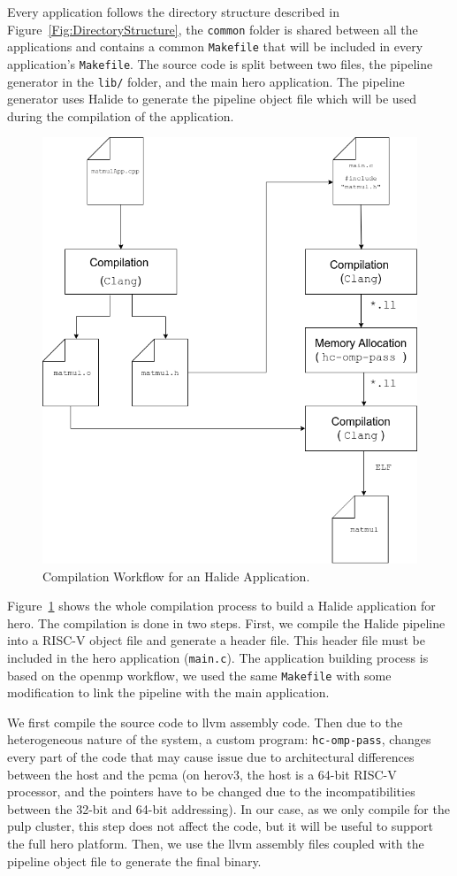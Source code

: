     Every application follows the directory structure described in Figure~\ref{Fig:DirectoryStructure}, the \texttt{common} folder is shared between all the applications and contains a common \texttt{Makefile} that will be included in every application's \texttt{Makefile}.
    The source code is split between two files, the pipeline generator in the \texttt{lib/} folder, and the main \gls{hero} application.
    The pipeline generator uses Halide to generate the pipeline object file which will be used during the compilation of the application.

\begin{figure}[h]
    \centering
    \includegraphics[width=.5\textwidth]{./figures_raw/compilationWorkflow.png}
    \caption{Compilation Workflow for an Halide Application.}
    \label{fig:compwork}
\end{figure}

    Figure~\ref{fig:compwork} shows the whole compilation process to build a Halide application for \gls{hero}.
    The compilation is done in two steps. First, we compile the Halide pipeline into a RISC-V object file and generate a header file.
    This header file must be included in the \gls{hero} application (\texttt{main.c}).
    The application building process is based on the \gls{openmp} workflow, we used the same \texttt{Makefile} with some modification to link the pipeline with the main application. 

    We first compile the source code to \gls{llvm} assembly code. Then due to the heterogeneous nature of the system, a custom program: \texttt{hc-omp-pass}, changes every part of the code that may cause issue due to architectural differences between the host and the \gls{pcma} (on \gls{hero}v3, the host is a 64-bit RISC-V processor, and the pointers have to be changed due to the incompatibilities between the 32-bit and 64-bit addressing).
    In our case, as we only compile for the \gls{pulp} cluster, this step does not affect the code, but it will be useful to support the full \gls{hero} platform. 
    Then, we use the \gls{llvm} assembly files coupled with the pipeline object file to generate the final binary.


